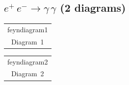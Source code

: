\documentclass[a4paper,11pt]{article}
\makeatletter
\newcommand{\FeynDiagram}[1]{\csname feyndiagram#1\endcsname}
\newcommand{\FeynCell}[1]{\begin{tabular}[t]{@{}c@{}}\FeynDiagram{#1}\\[1ex]\small Diagram~#1\end{tabular}}
\makeatother
\begin{document}
\setlength{\parindent}{0pt}
\subsection*{$e^{+}\,e^{-} \to \gamma\,\gamma$ \normalfont(2 diagrams)}
\noindent \FeynCell{1}\hfill \FeynCell{2}\par\bigskip
\end{document}
